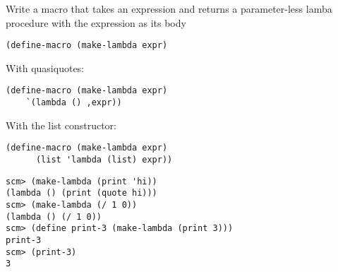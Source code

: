 \question Write a macro that takes an expression and returns
a parameter-less lamba procedure with the expression as its body

\begin{lstlisting}
(define-macro (make-lambda expr)
\end{lstlisting}

\begin{solution}[.6in]
With quasiquotes:
\begin{lstlisting}
(define-macro (make-lambda expr)
    `(lambda () ,expr))
\end{lstlisting}
With the list constructor:
\begin{lstlisting}
(define-macro (make-lambda expr)
      (list 'lambda (list) expr))
\end{lstlisting}

\end{solution}
\begin{lstlisting}
scm> (make-lambda (print 'hi))
(lambda () (print (quote hi)))
scm> (make-lambda (/ 1 0))
(lambda () (/ 1 0))
scm> (define print-3 (make-lambda (print 3)))
print-3
scm> (print-3)
3
\end{lstlisting}
